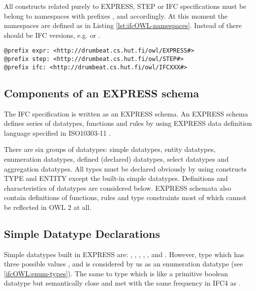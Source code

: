 \begin{ontologyRule}
All constructs related purely to EXPRESS, STEP or IFC specifications must be belong to namespaces with prefixes ,  and  accordingly. At this moment the namespaces are defined as in Listing \ref{lst:ifcOWL-namespaces}. Instead of  there should be IFC versions, e.g.  or .
\end{ontologyRule}

\begin{lstlisting}[caption={Namespace definitions},label=lst:ifcOWL-namespaces]
@prefix expr: <http://drumbeat.cs.hut.fi/owl/EXPRESS#>
@prefix step: <http://drumbeat.cs.hut.fi/owl/STEP#>
@prefix ifc: <http://drumbeat.cs.hut.fi/owl/IFCXXX#>
\end{lstlisting}


\subsection{Components of an EXPRESS schema}
The IFC specification is written as an EXPRESS schema. An EXPRESS schema defines series of data\-types, functions and rules by using EXPRESS data definition language specified in ISO10303-11 \cite{wiki:express,noauthor:ifc-guide}.

There are six groups of data\-types: simple data\-types, entity data\-types, enumeration data\-types, defined (declared) data\-types, select data\-types and aggregation data\-types. All types must be declared obviously by using constructs TYPE and ENTITY except the built-in simple data\-types. Definitions and characteristics of data\-types are considered below. EXPRESS schemata also contain definitions of functions, rules and type constraints most of which cannot be reflected in OWL 2 at all.

\subsection{Simple Datatype Declarations}
\label{subsec:ifcOWL-simple-type}

Simple data\-types built in EXPRESS are: , , , , ,  and . However, type  which has three possible values ,  and  is considered by us as an enumeration data\-type (see \ref{ifcOWL:enum-types}). The same to type  which is like a primitive boolean data\-type but semantically close and met with the same frequency in IFC4 as .

